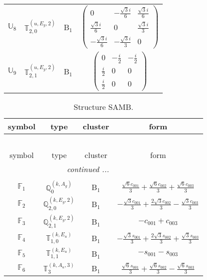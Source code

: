 \documentclass[fleqn,10pt,landscape]{article}
\begin{document}
\begin{itemize}
\begin{center}
\begin{longtable}{c|c|c|c}
$ \mathbb{U}_{8} $ & $\mathbb{T}_{2,0}^{(u,E_{g},2)}$ & B$_{1}$ & $\begin{pmatrix} 0 & - \frac{\sqrt{3} i}{6} & \frac{\sqrt{3} i}{6} \\ \frac{\sqrt{3} i}{6} & 0 & \frac{\sqrt{3} i}{3} \\ - \frac{\sqrt{3} i}{6} & - \frac{\sqrt{3} i}{3} & 0 \end{pmatrix}$ \\
$ \mathbb{U}_{9} $ & $\mathbb{T}_{2,1}^{(u,E_{g},2)}$ & B$_{1}$ & $\begin{pmatrix} 0 & - \frac{i}{2} & - \frac{i}{2} \\ \frac{i}{2} & 0 & 0 \\ \frac{i}{2} & 0 & 0 \end{pmatrix}$ \\
\end{longtable}
\end{center}
\begin{center}
\renewcommand{\arraystretch}{1.3}
\begin{longtable}{c|c|c|c}
\caption{Structure SAMB.}
 \\
 \hline \hline
symbol & type & cluster & form \\ \hline \endfirsthead

\multicolumn{3}{l}{\tablename\ \thetable{}} \\
 \hline \hline
symbol & type & cluster & form \\ \hline \endhead

 \hline \hline
\multicolumn{3}{r}{\footnotesize\it continued ...} \\ \endfoot

 \hline \hline
\multicolumn{3}{r}{} \\ \endlastfoot

$ \mathbb{F}_{1} $ & $\mathbb{Q}_{0}^{(k,A_{g})}$ & B$_{1}$ & $\frac{\sqrt{6} c_{001}}{3} + \frac{\sqrt{6} c_{002}}{3} + \frac{\sqrt{6} c_{003}}{3}$ \\
$ \mathbb{F}_{2} $ & $\mathbb{Q}_{2,0}^{(k,E_{g},2)}$ & B$_{1}$ & $- \frac{\sqrt{3} c_{001}}{3} + \frac{2 \sqrt{3} c_{002}}{3} - \frac{\sqrt{3} c_{003}}{3}$ \\
$ \mathbb{F}_{3} $ & $\mathbb{Q}_{2,1}^{(k,E_{g},2)}$ & B$_{1}$ & $- c_{001} + c_{003}$ \\
$ \mathbb{F}_{4} $ & $\mathbb{T}_{1,0}^{(k,E_{u})}$ & B$_{1}$ & $- \frac{\sqrt{3} s_{001}}{3} + \frac{2 \sqrt{3} s_{002}}{3} + \frac{\sqrt{3} s_{003}}{3}$ \\
$ \mathbb{F}_{5} $ & $\mathbb{T}_{1,1}^{(k,E_{u})}$ & B$_{1}$ & $- s_{001} - s_{003}$ \\
$ \mathbb{F}_{6} $ & $\mathbb{T}_{3}^{(k,A_{u},3)}$ & B$_{1}$ & $\frac{\sqrt{6} s_{001}}{3} + \frac{\sqrt{6} s_{002}}{3} - \frac{\sqrt{6} s_{003}}{3}$ \\
\end{longtable}
\end{center}


\end{itemize}
\end{document}
